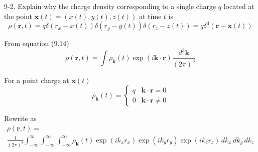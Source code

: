 \documentclass[12pt]{article}
\begin{document}
9-2.
Explain why the charge density corresponding to a single
charge $q$ located at the point $\mathbf x(t)=(x(t),y(t),z(t))$
at time $t$ is
\begin{equation*}
\rho(\mathbf r,t)=q
\delta(r_x-x(t))
\delta(r_y-y(t))
\delta(r_z-z(t))
=q\delta^3(\mathbf r-\mathbf x(t))
\end{equation*}

From equation (9.14)
\begin{equation*}
\rho(\mathbf r,t)=\int\rho_{\mathbf k}(t)
\exp(i\mathbf k\cdot\mathbf r)
\frac{d^3\mathbf k}{(2\pi)^3}
\end{equation*}

For a point charge at $\mathbf x(t)$
\begin{equation*}
\rho_{\mathbf k}(t)=\begin{cases}
q & \mathbf k\cdot\mathbf r=0
\\
0 & \mathbf k\cdot\mathbf r\ne0
\end{cases}
\end{equation*}

Rewrite as
\begin{multline*}
\rho(\mathbf r,t)=
\\
\frac{1}{(2\pi)^3}
\int_{-\infty}^\infty
\int_{-\infty}^\infty
\int_{-\infty}^\infty
\rho_{\mathbf k}(t)
\exp(ik_xr_x)
\exp(ik_yr_y)
\exp(ik_zr_z)
\,dk_x\,dk_y\,dk_z
\end{multline*}
\end{document}
